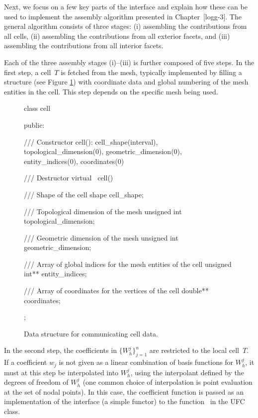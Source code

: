 Next, we focus on a few key parts of the interface and explain how
these can be used to implement the assembly algorithm presented in
Chapter~[logg-3]. The general algorithm consists of three stages:
(i) assembling the contributions from all cells, (ii) assembling the
contributions from all exterior facets, and (iii) assembling the
contributions from all interior facets.

Each of the three assembly stages (i)--(iii) is further composed of
five steps. In the first step, a cell~$T$ is fetched from the mesh,
typically implemented by filling a  structure (see Figure
\ref{fig:cellcode}) with coordinate data and global numbering of the
mesh entities in the cell. This step depends on the specific mesh
being used.

\begin{figure}
{\scriptsize
\begin{code}
class cell
{
public:

  /// Constructor
  cell(): cell_shape(interval),
          topological_dimension(0), geometric_dimension(0),
          entity_indices(0), coordinates(0) {}

  /// Destructor
  virtual ~cell() {}

  /// Shape of the cell
  shape cell_shape;

  /// Topological dimension of the mesh
  unsigned int topological_dimension;

  /// Geometric dimension of the mesh
  unsigned int geometric_dimension;

  /// Array of global indices for the mesh entities of the cell
  unsigned int** entity_indices;

  /// Array of coordinates for the vertices of the cell
  double** coordinates;

};
\end{code}
}
\caption{Data structure for communicating cell data.}
\label{fig:cellcode}
\end{figure}

In the second step, the coefficients in
$\{W_h^j\}_{j=1}^n$ are restricted to the local cell~$T$. If a
coefficient $w_j$ is not given as a linear combination of basis
functions for $W_h^j$, it must at this step be interpolated into
$W_h^j$, using the interpolant defined by the degrees of freedom of
$W_h^j$ (one common choice of interpolation is point evaluation at the set of nodal points). In
this case, the coefficient function is passed as an implementation of
the  interface (a simple functor) to the
function~ in the UFC  class.

